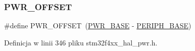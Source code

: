 \subsubsection{\texorpdfstring{P\+W\+R\+\_\+\+O\+F\+F\+S\+ET}{PWR\_OFFSET}}
{\footnotesize\ttfamily \#define P\+W\+R\+\_\+\+O\+F\+F\+S\+ET~(\hyperlink{group___peripheral__memory__map_gac691ec23dace8b7a649a25acb110217a}{P\+W\+R\+\_\+\+B\+A\+SE} -\/ \hyperlink{group___peripheral__memory__map_ga9171f49478fa86d932f89e78e73b88b0}{P\+E\+R\+I\+P\+H\+\_\+\+B\+A\+SE})}



Definicja w linii 346 pliku stm32f4xx\+\_\+hal\+\_\+pwr.\+h.

